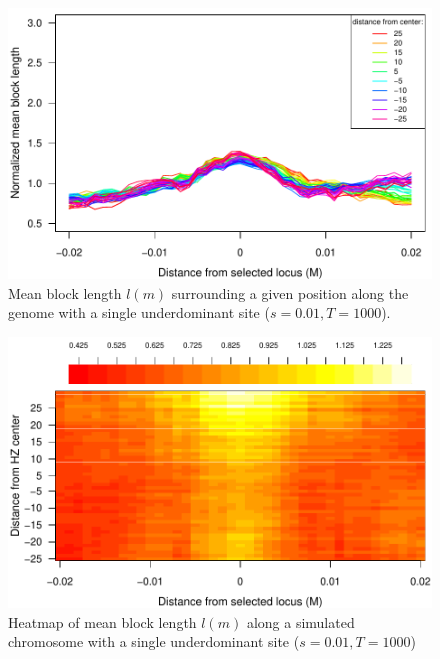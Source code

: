 \begin{figure}
\includegraphics{figs/blocksAlongChromNoConditioning.pdf}
\caption{Mean block length $l(m)$ surrounding a given position along the genome with a single underdominant site ($s=0.01, T=1000$). }\label{Supp:blockLengthNoAnc}
\end{figure}

\begin{figure}
\includegraphics{figs/blocksAlongChromHeatmap.pdf}
\caption{Heatmap of mean block length $l(m)$ along a simulated chromosome with a single underdominant site ($s=0.01, T=1000$) }\label{Supp:blockLengthHeatmapNoAnc}
\end{figure}


